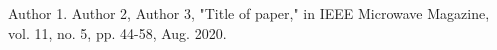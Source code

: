 \begin{thebibliography}{biblio}
	 Author 1. Author 2, Author 3, "Title of paper," in IEEE Microwave Magazine, vol. 11, no. 5, pp. 44-58, Aug. 2020.	
\end{thebibliography}
